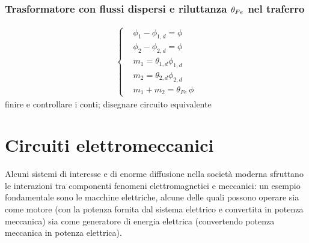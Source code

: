 \documentclass[letterpaper,10pt,italian]{jupyterBook}
\begin{document}
\subsubsection{Trasformatore con flussi dispersi e riluttanza \protect\(\theta_{Fe}\protect\) nel traferro}
\label{\detokenize{ch/circuits-electromagnetic-transformer:trasformatore-con-flussi-dispersi-e-riluttanza-theta-fe-nel-traferro}}\begin{equation*}
\begin{split}\begin{cases}
 & \phi_{1} - \phi_{1,d} = \phi \\
 & \phi_{2} - \phi_{2,d} = \phi \\
 & m_{1} = \theta_{1,d} \phi_{1,d} \\
 & m_{2} = \theta_{2,d} \phi_{2,d} \\
 & m_1   + m_{2} = \theta_{Fe} \, \phi
\end{cases}\end{split}
\end{equation*}
\sphinxAtStartPar
{} finire e controllare i conti; disegnare circuito equivalente



\sphinxstepscope




\section{Circuiti elettromeccanici}
\label{\detokenize{ch/circuits-electromechanic:circuiti-elettromeccanici}}\label{\detokenize{ch/circuits-electromechanic:classical-electromagnetism-circuits-electromechanic}}\label{\detokenize{ch/circuits-electromechanic::doc}}
\sphinxAtStartPar
Alcuni sistemi di interesse e di enorme diffusione nella società moderna sfruttano le interazioni tra componenti fenomeni elettromagnetici e meccanici: un esempio fondamentale sono le macchine elettriche, alcune delle quali possono operare sia come motore (con la potenza fornita dal sistema elettrico e convertita in potenza meccanica) sia come generatore di energia elettrica (convertendo potenza meccanica in potenza elettrica).
\end{document}
